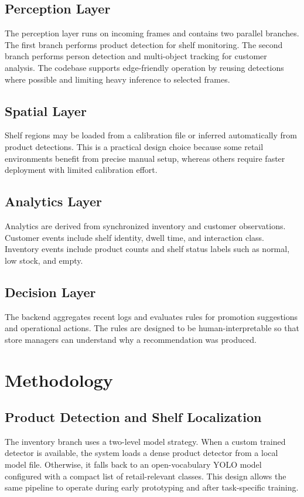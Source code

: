 \documentclass[conference]{IEEEtran}
\begin{document}
\subsection{Perception Layer}
The perception layer runs on incoming frames and contains two parallel branches. The first branch performs product detection for shelf monitoring. The second branch performs person detection and multi-object tracking for customer analysis. The codebase supports edge-friendly operation by reusing detections where possible and limiting heavy inference to selected frames.

\subsection{Spatial Layer}
Shelf regions may be loaded from a calibration file or inferred automatically from product detections. This is a practical design choice because some retail environments benefit from precise manual setup, whereas others require faster deployment with limited calibration effort.

\subsection{Analytics Layer}
Analytics are derived from synchronized inventory and customer observations. Customer events include shelf identity, dwell time, and interaction class. Inventory events include product counts and shelf status labels such as normal, low stock, and empty.

\subsection{Decision Layer}
The backend aggregates recent logs and evaluates rules for promotion suggestions and operational actions. The rules are designed to be human-interpretable so that store managers can understand why a recommendation was produced.

\section{Methodology}

\subsection{Product Detection and Shelf Localization}

The inventory branch uses a two-level model strategy. When a custom trained detector is available, the system loads a dense product detector from a local model file. Otherwise, it falls back to an open-vocabulary YOLO model configured with a compact list of retail-relevant classes. This design allows the same pipeline to operate during early prototyping and after task-specific training.
\end{document}
